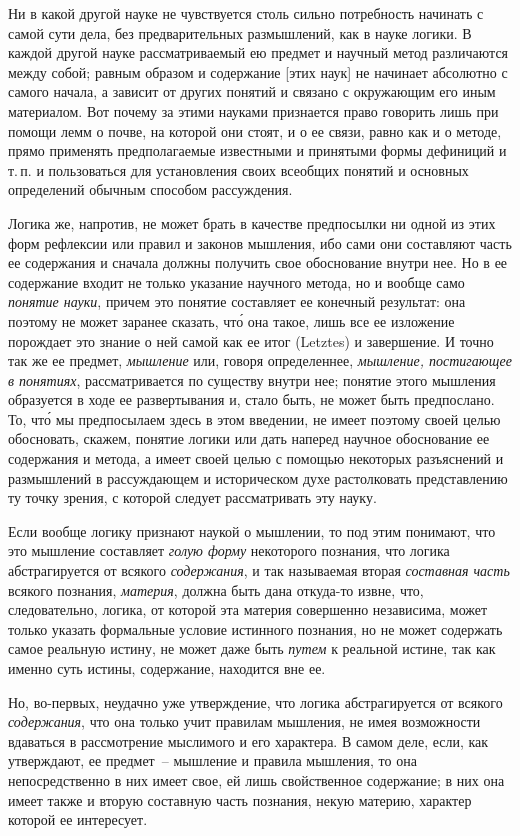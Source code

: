 Ни в какой другой науке не чувствуется столь сильно
потребность начинать с самой сути дела, без предварительных
размышлений, как в науке логики. В каждой
другой науке рассматриваемый ею предмет и научный
метод различаются между собой; равным образом и содержание
[этих наук] не начинает абсолютно с самого
начала, а зависит от других понятий и связано с окружающим
его иным материалом. Вот почему за этими науками
признается право говорить лишь при помощи лемм
о почве, на которой они стоят, и о ее связи, равно как
и о методе, прямо применять предполагаемые известными
и принятыми формы дефиниций и т.\,п. и пользоваться
для установления своих всеобщих понятий и основных
определений обычным способом рассуждения.

Логика же, напротив, не может брать в качестве
предпосылки ни одной из этих форм рефлексии или
правил и законов мышления, ибо сами они составляют
часть ее содержания и сначала должны получить свое
обоснование внутри нее. Но в ее содержание входит не
только указание научного метода, но и вообще само
\emph{понятие науки}, причем это понятие составляет ее конечный
результат: она поэтому не может заранее сказать,
чт\'о она такое, лишь все ее изложение порождает это
знание о ней самой как ее итог (Letztes) и завершение.
И точно так же ее предмет, \emph{мышление} или, говоря определеннее,
\emph{мышление, постигающее в понятиях}, рассматривается
по существу внутри нее; понятие этого мышления
образуется в ходе ее развертывания и, стало быть,
не может быть предпослано. То, чт\'о мы предпосылаем
здесь в этом введении, не имеет поэтому своей целью
обосновать, скажем, понятие логики или дать наперед
научное обоснование ее содержания и метода, а имеет
своей целью с помощью некоторых разъяснений и размышлений
в рассуждающем и историческом духе растолковать
представлению ту точку зрения, с которой
следует рассматривать эту науку.

Если вообще логику признают наукой о мышлении,
то под этим понимают, что это мышление составляет
\emph{голую форму} некоторого познания, что логика абстрагируется
от всякого \emph{содержания}, и так называемая вторая
\emph{составная часть} всякого познания, \emph{материя}, должна быть
дана откуда-то извне, что, следовательно, логика, от которой
эта материя совершенно независима, может только
указать формальные условие истинного познания, но не
может содержать самое реальную истину, не может даже
быть \emph{путем} к реальной истине, так как именно суть истины,
содержание, находится вне ее.

Но, во-первых, неудачно уже утверждение, что логика
абстрагируется от всякого \emph{содержания}, что она только
учит правилам мышления, не имея возможности вдаваться
в рассмотрение мыслимого и его характера. В самом
деле, если, как утверждают, ее предмет~-- мышление
и правила мышления, то она непосредственно в них имеет
свое, ей лишь свойственное содержание; в них она имеет
также и вторую составную часть познания, некую материю,
характер которой ее интересует.

